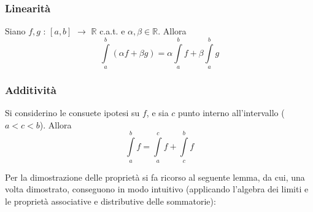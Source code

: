 \documentclass[10pt, oneside]{book}
\theoremstyle{plain}
\begin{document}
\subsubsection{Linearità}
Siano $f,g$ : $[a,b]$ $\rightarrow$ $\mathbb{R}$ c.a.t. e $\alpha, \beta \in \mathbb{R}$. Allora
\[\int\limits_{a}^{b} (\alpha f + \beta g) = \alpha \int\limits_{a}^{b} f + \beta \int\limits_{a}^{b} g\]

\subsubsection{Additività}
Si considerino le consuete ipotesi su $f$, e sia $c$ punto interno all'intervallo ($a < c < b$). Allora
\[\int\limits_{a}^{b} f = \int\limits_{a}^{c} f + \int\limits_{c}^{b} f\]

Per la dimostrazione delle proprietà si fa ricorso al seguente lemma, da cui, una volta dimostrato, conseguono in modo intuitivo (applicando l'algebra dei limiti e le proprietà associative e distributive delle sommatorie):
\end{document}

